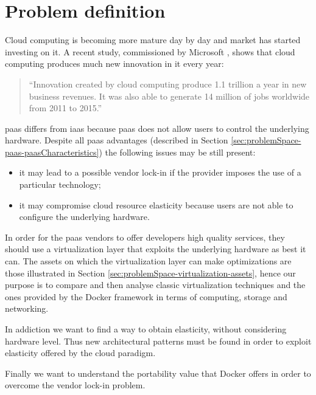 %
%
\section{Problem definition}
\label{sec:problemSpace-problem}
Cloud computing is becoming more mature day by day and market has started investing on it. A recent
study, commissioned by Microsoft \cite{microsftCloudNewJob}, shows that cloud computing produces much
new innovation in \acs{it} every year:

\begin{center}
	\begin{quote}
		``Innovation created by cloud computing produce \textdollar{}1.1 trillion a year in new
		business revenues. It was also able to generate 14 million of jobs worldwide from 2011 to 2015.''
	\end{quote}
\end{center}

\ac{paas} differs from \ac{iaas} because \ac{paas} does not allow users to control the underlying
hardware. Despite all \ac{paas} advantages (described in Section \ref{sec:problemSpace-paas-paasCharacteristics})
the following issues may be still present:

\begin{itemize}
	\item{it may lead to a possible vendor lock-in if the provider imposes the use of a particular
		technology;}
	\item{it may compromise cloud resource elasticity because users are not able to configure the
		underlying hardware.}
\end{itemize}

In order for the \ac{paas} vendors to offer developers high quality services, they should use a 
virtualization layer that exploits the underlying hardware as best it can. The assets on which the
virtualization layer can make optimizations are those illustrated in Section
\ref{sec:problemSpace-virtualization-assets}, hence our purpose is to compare and then analyse
classic virtualization techniques and the ones provided by the Docker framework in terms of computing,
storage and networking.

In addiction we want to find a way to obtain elasticity, without considering hardware level. Thus new
architectural patterns must be found in order to exploit elasticity offered by the cloud paradigm.

Finally we want to understand the portability value that Docker offers in order to overcome the vendor
lock-in problem.